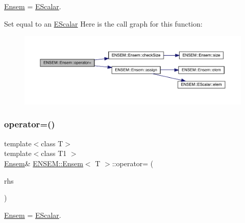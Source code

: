 \mbox{\hyperlink{classENSEM_1_1Ensem}{Ensem}} = \mbox{\hyperlink{classENSEM_1_1EScalar}{E\+Scalar}}. 

Set equal to an \mbox{\hyperlink{classENSEM_1_1EScalar}{E\+Scalar}} Here is the call graph for this function\+:
\nopagebreak
\begin{figure}[H]
\begin{center}
\leavevmode
\includegraphics[width=350pt]{d7/d3e/classENSEM_1_1Ensem_a376ab0239198595a09384c13d7a1ad1c_cgraph}
\end{center}
\end{figure}
\mbox{\label{classENSEM_1_1Ensem_a376ab0239198595a09384c13d7a1ad1c}} 
\subsubsection{\texorpdfstring{operator=()}{operator=()}\hspace{0.1cm}{\footnotesize\ttfamily [8/15]}}
{\footnotesize\ttfamily template$<$class T$>$ \\
template$<$class T1 $>$ \\
\mbox{\hyperlink{classENSEM_1_1Ensem}{Ensem}}\& \mbox{\hyperlink{classENSEM_1_1Ensem}{E\+N\+S\+E\+M\+::\+Ensem}}$<$ T $>$\+::operator= (\begin{DoxyParamCaption}\item[{const \mbox{\hyperlink{classENSEM_1_1EScalar}{E\+Scalar}}$<$ T1 $>$ \&}]{rhs }\end{DoxyParamCaption})\hspace{0.3cm}{\ttfamily [inline]}}



\mbox{\hyperlink{classENSEM_1_1Ensem}{Ensem}} = \mbox{\hyperlink{classENSEM_1_1EScalar}{E\+Scalar}}. 


